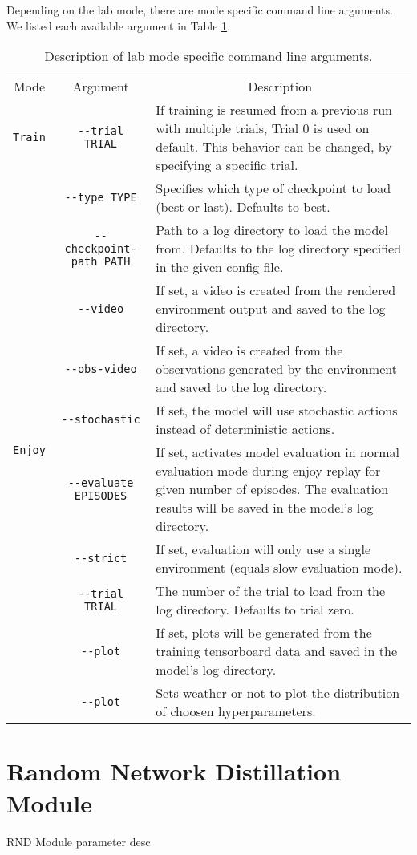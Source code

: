 Depending on the lab mode, there are mode specific command line arguments. We listed each available argument in Table \ref{tab:CommandLineArguments}.

\begin{table}[ht]
    \begin{center}
        \small
        \bgroup
        \def\arraystretch{1.25}%
        \begin{tabular}{|c|c|p{}|}
            \hline
            Mode & Argument & \multicolumn{1}{c|}{Description} \\
            \hhline{|=|=|=|}
            \texttt{Train} & \texttt{-{}-trial TRIAL} & If training is resumed from a previous run with multiple trials, Trial 0 is used on default. This behavior can be changed, by specifying a specific trial. \\
            \hline
            \multirow{15}{*}{\texttt{Enjoy}} & \texttt{-{}-type TYPE} & Specifies which type of checkpoint to load (best or last). Defaults to best. \\
            & \texttt{-{}-checkpoint-path PATH} & Path to a log directory to load the model from. Defaults to the log directory specified in the given config file. \\
            & \texttt{-{}-video} & If set, a video is created from the rendered environment output and saved to the log directory. \\
            & \texttt{-{}-obs-video} & If set, a video is created from the observations generated by the environment and saved to the log directory. \\
            & \texttt{-{}-stochastic} & If set, the model will use stochastic actions instead of deterministic actions. \\
            & \texttt{-{}-evaluate EPISODES} & If set, activates model evaluation in normal evaluation mode during enjoy replay for given number of episodes. The evaluation results will be saved in the model's log directory. \\
            & \texttt{-{}-strict} & If set, evaluation will only use a single environment (equals slow evaluation mode). \\
            & \texttt{-{}-trial TRIAL} & The number of the trial to load from the log directory. Defaults to trial zero. \\
            & \texttt{-{}-plot} & If set, plots will be generated from the training tensorboard data and saved in the model's log directory.\\
            \hline
            \texttt{Search} & \texttt{-{}-plot} & Sets weather or not to plot the distribution of choosen hyperparameters. \\
            \hline
        \end{tabular}
        \egroup
    \end{center}
    \caption[Mode Specific Command Line Arguments]{Description of lab mode specific command line arguments.} \label{tab:CommandLineArguments}
\end{table}

\section{Random Network Distillation Module}
RND Module parameter desc
